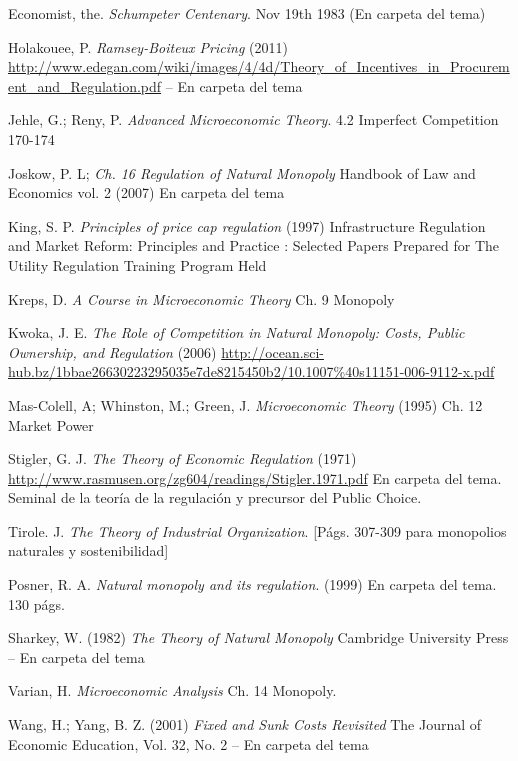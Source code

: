 \documentclass{nuevotema}
\begin{document}
Economist, the. \textit{Schumpeter Centenary}. Nov 19th 1983 (En carpeta del tema)

Holakouee, P. \textit{Ramsey-Boiteux Pricing} (2011) \url{http://www.edegan.com/wiki/images/4/4d/Theory_of_Incentives_in_Procurement_and_Regulation.pdf} -- En carpeta del tema

Jehle, G.; Reny, P. \textit{Advanced Microeconomic Theory}. 4.2 Imperfect Competition 170-174

Joskow, P. L; \textit{Ch. 16 Regulation of Natural Monopoly} Handbook of Law and Economics vol. 2 (2007) En carpeta del tema

King, S. P. \textit{Principles of price cap regulation} (1997) Infrastructure Regulation and Market Reform: Principles and Practice : Selected Papers Prepared for The Utility Regulation Training Program Held 

Kreps, D. \textit{A Course in Microeconomic Theory} Ch. 9 Monopoly

Kwoka, J. E. \textit{The Role of Competition in Natural Monopoly: Costs, Public Ownership, and Regulation} (2006) \url{http://ocean.sci-hub.bz/1bbae26630223295035e7de8215450b2/10.1007\%40s11151-006-9112-x.pdf}

Mas-Colell, A; Whinston, M.; Green, J. \textit{Microeconomic Theory} (1995) Ch. 12 Market Power

Stigler, G. J. \textit{The Theory of Economic Regulation} (1971) \url{http://www.rasmusen.org/zg604/readings/Stigler.1971.pdf} En carpeta del tema. Seminal de la teoría de la regulación y precursor del Public Choice.

Tirole. J. \textit{The Theory of Industrial Organization}. [Págs. 307-309 para monopolios naturales y sostenibilidad]

Posner, R. A. \textit{Natural monopoly and its regulation}. (1999) En carpeta del tema. 130 págs.

Sharkey, W. (1982) \textit{The Theory of Natural Monopoly} Cambridge University Press -- En carpeta del tema

Varian, H. \textit{Microeconomic Analysis} Ch. 14 Monopoly.

Wang, H.; Yang, B. Z. (2001) \textit{Fixed and Sunk Costs Revisited} The Journal of Economic Education, Vol. 32, No. 2 -- En carpeta del tema
\end{document}
